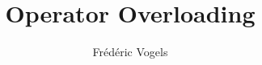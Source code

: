 \usepackage{ucll-code}
\usetikzlibrary{shadows,shapes.multipart}

\title{Operator Overloading}
\author{Fr\'ed\'eric Vogels}


\lstset{language=c++14}




\begin{frame}
  \titlepage
\end{frame}










